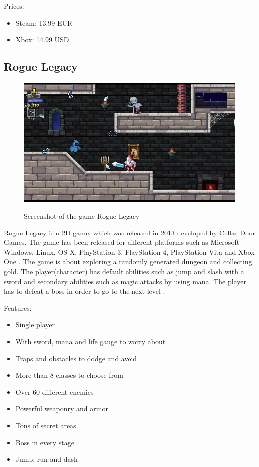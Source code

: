 \documentclass[12p]{article}
\begin{document}
Prices:

\begin{itemize}
  \item Steam: 13.99 EUR
  \item Xbox: 14.99 USD
\end{itemize}

\subsection{Rogue Legacy}

\begin{figure}[ht]
  \center
  \includegraphics[width=1\textwidth]{StateOfTheArtScreenshots/rogue_legacy}
  \label{StateOfTheArt_Screenshots_RogueLegacy}
  \caption{Screenshot of the game Rogue Legacy \cite{RogueLegacyScreenshot}}
\end{figure}

Rogue Legacy is a 2D game, which was released in 2013 developed by Cellar Door Games. The game has been released for different platforms such as Microsoft Windows, Linux, OS X, PlayStation 3, PlayStation 4, PlayStation Vita and Xbox One \cite{RogueLegacyWiki}. The game is about exploring a randomly generated dungeon and collecting gold. The player(character) has default abilities such as jump and slash with a sword and secondary abilities such as magic attacks by using mana. The player has to defeat a boss in order to go to the next level \cite{RogueLegacyReview}.

Features: \cite{RogueLegacySteam}

\begin{itemize}
  \item Single player
  \item With sword, mana and life gauge to worry about
  \item Traps and obstacles to dodge and avoid
  \item More than 8 classes to choose from
  \item Over 60 different enemies
  \item Powerful weaponry and armor
  \item Tons of secret areas
  \item Boss in every stage
  \item Jump, run and dash
\end{itemize}
\end{document}
